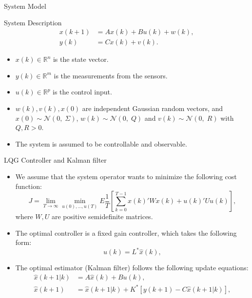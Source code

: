 \documentclass[10pt]{beamer}
\begin{document}
\begin{frame}{System Model}
  \begin{block}{System Description}
      \begin{displaymath}
	\begin{split}
	  x(k+1) &= Ax(k)  + Bu(k)+w(k),\\
	  y(k) &= C x(k) + v(k).
	\end{split}
      \end{displaymath}
    \end{block}
    \begin{itemize}
      \item $x(k) \in \mathbb R^n$ is the state vector.
      \item  $y(k) \in \mathbb R^m$ is the measurements from the sensors.
      \item  $u(k) \in \mathbb R^p$ is the control input.
      \item $w(k),v(k),x(0)$ are independent Gaussian random vectors, and $x(0) \sim \mathcal N(0,\;\Sigma)$, $w(k) \sim \mathcal N(0,\;Q)$ and $v(k) \sim \mathcal N(0,\;R)$ with $Q,R>0$.
      \item The system is assumed to be controllable and observable.
    \end{itemize}
  \end{frame}

  \begin{frame}{LQG Controller and Kalman filter}
    \begin{itemize}
      \item We assume that the system operator wants to minimize the following cost function:
	\begin{displaymath}
	  J = \lim_{T\rightarrow \infty}\min_{u(0),\ldots,u(T)}E\frac{1}{T}\left[\sum_{k=0}^{T-1} x(k)'Wx(k)+u(k)'Uu(k)\right],
	\end{displaymath}
	where $W, U$ are positive semidefinite matrices. 
      \item The optimal controller is a fixed gain controller, which takes the following form:
	\begin{displaymath}
	  u(k) =  L^*\hat x(k),
	\end{displaymath}
      \item The optimal estimator (Kalman filter) follows the following update equations:
	\begin{align*}
	  \hat x(k+1|k) &= A\hat x(k)+Bu(k),\\
	  \hat x(k+1) &= \hat x(k+1|k) + K^*\left[y(k+1) - C\hat x(k+1|k)\right],
	\end{align*}
    \end{itemize}
  \end{frame}
\end{document}
